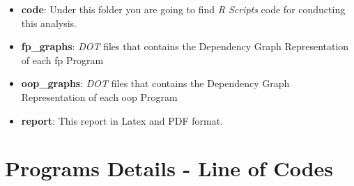 \documentclass[12pt, a4paper]{article}
\begin{document}
\begin{itemize}
    \item \textbf{code}: Under this folder you are going to find \textit{R Scripts} code for conducting this analysis.
    \item \textbf{fp\_graphs}: \textit{DOT} files that contains the Dependency Graph Representation of each \acrlong{fp} Program
    \item \textbf{oop\_graphs}: \textit{DOT} files that contains the Dependency Graph Representation of each \acrlong{oop} Program
    \item \textbf{report}: This report in Latex and PDF format.
\end{itemize}

\section{Programs Details - Line of Codes}
\end{document}
